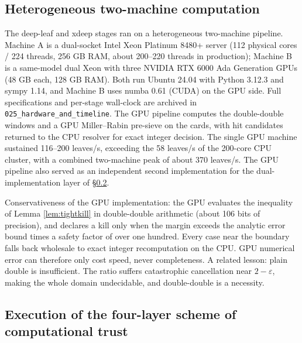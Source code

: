 \documentclass[11pt]{article}
\theoremstyle{remark}
\begin{document}
\subsection{Heterogeneous two-machine computation}\label{sec:hw}

The deep-leaf and xdeep stages ran on a heterogeneous two-machine pipeline. Machine A is a dual-socket Intel Xeon Platinum 8480+ server (112 physical cores / 224 threads, 256 GB RAM, about 200--220 threads in production); Machine B is a same-model dual Xeon with three NVIDIA RTX 6000 Ada Generation GPUs (48 GB each, 128 GB RAM). Both run Ubuntu 24.04 with Python 3.12.3 and sympy 1.14, and Machine B uses numba 0.61 (CUDA) on the GPU side. Full specifications and per-stage wall-clock are archived in \texttt{025\_hardware\_and\_timeline}. The GPU pipeline computes the double-double windows and a GPU Miller--Rabin pre-sieve on the cards, with hit candidates returned to the CPU resolver for exact integer decision. The single GPU machine sustained 116--200 leaves/s, exceeding the 58 leaves/s of the 200-core CPU cluster, with a combined two-machine peak of about 370 leaves/s. The GPU pipeline also served as an independent second implementation for the dual-implementation layer of \S\ref{sec:trust}.

Conservativeness of the GPU implementation: the GPU evaluates the inequality of Lemma \ref{lem:tightkill} in double-double arithmetic (about 106 bits of precision), and declares a kill only when the margin exceeds the analytic error bound times a safety factor of over one hundred. Every case near the boundary falls back wholesale to exact integer recomputation on the CPU. GPU numerical error can therefore only cost speed, never completeness. A related lesson: plain double is insufficient. The ratio suffers catastrophic cancellation near $2 - \varepsilon$, making the whole domain undecidable, and double-double is a necessity.

\subsection{Execution of the four-layer scheme of computational trust}\label{sec:trust}
\end{document}
